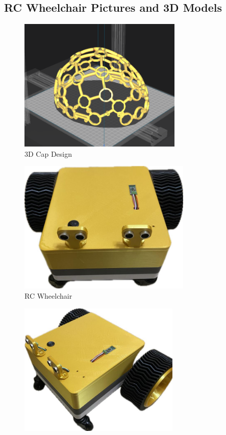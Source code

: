 \documentclass[conference]{IEEEtran}
\begin{document}
\subsection{RC Wheelchair Pictures and 3D Models}
\begin{figure}[h]
    \centering
    \includegraphics[keepaspectratio, height=2.5in]{figs/H/cap.png}
    \caption{3D Cap Design}
    \label{fig:3d_cap_design}
\end{figure}\begin{figure}[h]
    \centering
    \includegraphics[keepaspectratio, height=2.5in]{figs/H/rc0.png}
    \caption{RC Wheelchair}
    \label{fig:rc0}
\end{figure}\begin{figure}[h]
    \centering
    \includegraphics[keepaspectratio, height=2.5in]{figs/H/rc1.png}

\end{figure}
\end{document}

